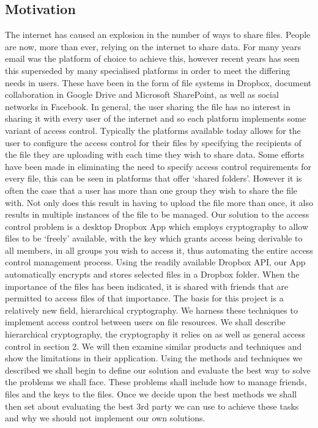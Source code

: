 \documentclass[12pt, titlepage]{article}
\begin{document}
\subsection{Motivation}
The internet has caused an explosion in the number of ways to share files. People are now, more than ever, relying on the internet to share data. For many years email was the platform of choice to achieve this, however recent years has seen this superseded by many specialised platforms in order to meet the differing needs in users. These have been in the form of file systems in Dropbox, document collaboration in Google Drive and Microsoft SharePoint, as well as social networks in Facebook. In general, the user sharing the file has no interest in sharing it with every user of the internet and so each platform implements some variant of access control. Typically the platforms available today allows for the user to configure the access control for their files by specifying the recipients of the file they are uploading with each time they wish to share data. Some efforts have been made in eliminating the need to specify access control requirements for every file, this can be seen in platforms that offer `shared folders'. However it is often the case that a user has more than one group they wish to share the file with. Not only does this result in having to upload the file more than once, it also results in multiple instances of the file to be managed. Our solution to the access control problem is a desktop Dropbox App which employs cryptography to allow files to be `freely' available, with the key which grants access being derivable to all members, in all groups you wish to access it, thus automating the entire access control management process. Using the readily available Dropbox API, our App automatically encrypts and stores selected files in a Dropbox folder. When the importance of the files has been indicated, it is shared with friends that are permitted to access files of that importance.
\newline
\newline \indent The basis for this project is a relatively new field, hierarchical cryptography. We harness these techniques to implement access control between users on file resources. We shall describe hierarchical cryptography, the cryptography it relies on as well as general access control in section 2. We will then examine similar products and techniques and show the limitations in their application.
\newline \indent Using the methods and techniques we described we shall begin to define our solution and evaluate the best way to solve the problems we shall face. These problems shall include how to manage friends, files and the keys to the files. Once we decide upon the best methods we shall then set about evaluating the best 3rd party we can use to achieve these tasks and why we should not implement our own solutions.
\end{document}
